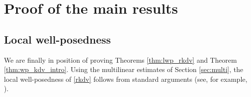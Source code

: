 \documentclass[%
11pt,  reqno]{amsart}
\newcommand{\5}{\textup{V}}
\newcommand{\noi}{\noindent}
\theoremstyle{remark}
\newcommand{\TT}{\mathcal{T}}
\newcommand{\bfrak}{\mathfrak{b}}
\newcommand{\gfrak}{\mathfrak{g}}
\newcommand{\ta}{\theta}
\numberwithin{equation}{section}
\numberwithin{theorem}{section}
\newcommand{\NN}{\mathrm{N}}
\newcommand{\andreia}[1]{\marginpar{\color{purple} $\Leftarrow\Leftarrow\Leftarrow$}{\smallskip \noi\color{purple}ANDREIA: #1}\smallskip}
\begin{document}




\section{Proof of the main results}\label{sec:lwp}

\subsection{Local well-posedness}
We are finally in position of proving Theorems \ref{thm:lwp_rkdv} and Theorem \ref{thm:wp_kdv_intro}.
Using the multilinear estimates of Section \ref{sec:multi}, the local well-posedness of \eqref{rkdv} follows from standard arguments (see, for example, \cite{Grunrock_mkdv, HerrGrunrock_FL}). 



\end{document}
